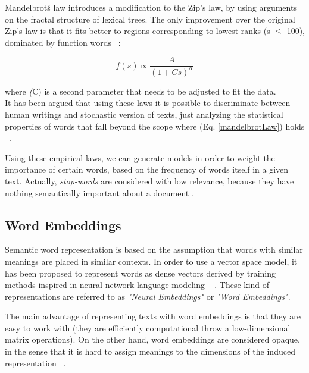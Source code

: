  Mandelbrot\'s law introduces a modification to the Zip's law, by using arguments on the fractal structure of lexical trees. The only improvement over the original Zip's law is that it fits better to regions corresponding to lowest ranks (s {$\le$} 100), dominated by function words ~\cite{montemurro2001beyond}: 

\begin{center}
\begin{equation}
\label{mandelbrotLaw}
f(s)  \propto  \frac{A}{(1+Cs)^{\alpha}} 
\end{equation}
\end{center}

where \textit(C) is a second parameter that needs to be adjusted to fit the data.\\

It has been argued that using these laws it is possible to discriminate between human writings and stochastic version of texts, just analyzing the statistical properties of words that fall beyond the scope where (Eq. \ref{mandelbrotLaw})  holds ~\cite{cohen1997numerical}.

Using these empirical laws, we can generate models in order to weight the importance of certain words, based on the frequency of words itself in a given text. Actually, \textit{stop-words} are considered with low relevance, because they have nothing semantically important about a document \cite{wilbur1992stopwords}.

%
\subsection{Word Embeddings}
%
Semantic word representation is based on the assumption that words with similar meanings are placed in similar contexts. 
In order to use a vector space model, it has been proposed  to represent words as dense vectors derived by training methods inspired in neural-network language modeling ~\cite{compositionality2013Mikolov}
. These kind of representations are referred to as \textit{"Neural Embeddings"} or \textit{"Word Embeddings"}. 

The main advantage of representing 
texts with word embeddings is that they are easy to work with (they are efficiently computational throw a low-dimensional matrix operations). On the other hand, word embeddings are considered opaque, in the sense that it is hard to assign meanings to the dimensions of the induced representation ~\cite{compositionality2013Mikolov}. 

